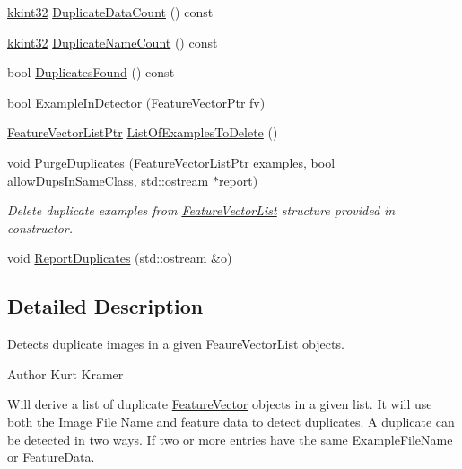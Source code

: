\begin{DoxyCompactItemize}
\item 
\hyperlink{namespace_k_k_b_a8fa4952cc84fda1de4bec1fbdd8d5b1b}{kkint32} \hyperlink{class_k_k_m_l_l_1_1_duplicate_images_a858ad11c2aa6c37d8056380d29ac7a85}{Duplicate\+Data\+Count} () const 
\item 
\hyperlink{namespace_k_k_b_a8fa4952cc84fda1de4bec1fbdd8d5b1b}{kkint32} \hyperlink{class_k_k_m_l_l_1_1_duplicate_images_ab9e89b957c93593d2856352c56f262a5}{Duplicate\+Name\+Count} () const 
\item 
bool \hyperlink{class_k_k_m_l_l_1_1_duplicate_images_a4dc58f0a758097cb3e051741a95f6f77}{Duplicates\+Found} () const 
\item 
bool \hyperlink{class_k_k_m_l_l_1_1_duplicate_images_a2dbd6a2c434fad6d0632cdab93641a52}{Example\+In\+Detector} (\hyperlink{namespace_k_k_m_l_l_a0c5df3d48f45926fbc4fee04f5e3bc04}{Feature\+Vector\+Ptr} fv)
\item 
\hyperlink{namespace_k_k_m_l_l_acf2ba92a3cf03e2b19674b24ff488ef6}{Feature\+Vector\+List\+Ptr} \hyperlink{class_k_k_m_l_l_1_1_duplicate_images_a39a0068e1d342959109906d9edce3b49}{List\+Of\+Examples\+To\+Delete} ()
\item 
void \hyperlink{class_k_k_m_l_l_1_1_duplicate_images_ae66271631fe02e9db051968b728769e7}{Purge\+Duplicates} (\hyperlink{namespace_k_k_m_l_l_acf2ba92a3cf03e2b19674b24ff488ef6}{Feature\+Vector\+List\+Ptr} examples, bool allow\+Dups\+In\+Same\+Class, std\+::ostream $\ast$report)
\begin{DoxyCompactList}\small\item\em Delete duplicate examples from \hyperlink{class_k_k_m_l_l_1_1_feature_vector_list}{Feature\+Vector\+List} structure provided in constructor. \end{DoxyCompactList}\item 
void \hyperlink{class_k_k_m_l_l_1_1_duplicate_images_af96423d0d03a2fcae24538e1037dd56b}{Report\+Duplicates} (std\+::ostream \&o)
\end{DoxyCompactItemize}


\subsection{Detailed Description}
Detects duplicate images in a given Feaure\+Vector\+List objects. 

\begin{DoxyAuthor}{Author}
Kurt Kramer
\end{DoxyAuthor}
Will derive a list of duplicate \hyperlink{class_k_k_m_l_l_1_1_feature_vector}{Feature\+Vector} objects in a given list. It will use both the Image File Name and feature data to detect duplicates. A duplicate can be detected in two ways. If two or more entries have the same Example\+File\+Name or Feature\+Data.

